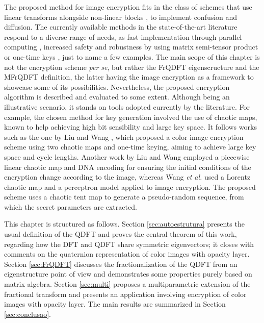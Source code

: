 The proposed method for image encryption fits in the class of schemes that use linear transforms alongside non-linear blocks \cite{hsue2018enhancing}, to implement confusion and diffusion. The currently available methods in the state-of-the-art literature respond to a diverse range of needs, as fast implementation through parallel computing \cite{wang2019fast}, increased safety and robustness by using matrix semi-tensor product \cite{wang2020image} or one-time keys \cite{liu2010}, just to name a few examples. The main scope of this chapter is not the encryption scheme \textit{per se}, but rather the FrQDFT eigenscructure and the MFrQDFT definition, the latter having the image encryption as a framework to showcase some of its possibilities. Nevertheless, the proposed encryption algorithm is described and evaluated to some extent. Although being an illustrative scenario, it stands on tools adopted currently by the literature. For example, the chosen method for key generation involved the use of chaotic maps, known to help achieving high bit sensibility and large key space. It follows works such as the one by Liu and Wang \cite{liu2011color}, which proposed a color image encryption scheme using two chaotic maps and one-time keying, aiming to achieve large key space and cycle lengths. Another work by Liu and Wang \cite{liu2012} employed a piecewise linear chaotic map and DNA encoding for ensuring the initial conditions of the encryption change according to the image, whereas Wang \textit{et al.} \cite{wang2010chaotic} used a Lorentz chaotic map and a perceptron model applied to image encryption. The proposed scheme uses a chaotic tent map to generate a pseudo-random sequence, from which the secret parameters are extracted.


This chapter is structured as follows. Section \ref{sec:autoestrutura} presents the usual definition of the QDFT and proves the central theorem of this work, regarding how the DFT and QDFT share symmetric eigenvectors; it closes with comments on the quaternion representation of color images with opacity layer. Section \ref{sec:FrQDFT} discusses the fractionalization of the QDFT from an eigenstructure point of view and demonstrates some properties purely based on matrix algebra. Section \ref{sec:multi} proposes a multiparametric extension of the fractional transform and presents an application involving encryption of color images with opacity layer. The main results are summarized in Section \ref{sec:conclusao}.



